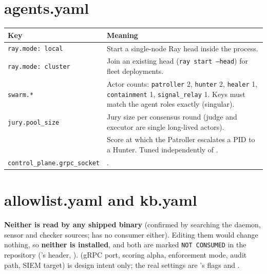 \section{agents.yaml}
\begin{center}\small
\begin{tabularx}{\textwidth}{@{}L{4.2cm}Y@{}}
\toprule
\textbf{Key} & \textbf{Meaning}\\
\midrule
\texttt{ray.mode: local} & Start a single-node Ray head inside the process.\\
\texttt{ray.mode: cluster} & Join an existing head (\texttt{ray start --head}) for fleet deployments.\\
\texttt{swarm.*} & Actor counts: \texttt{patroller} 2, \texttt{hunter} 2, \texttt{healer} 1, \texttt{containment} 1, \texttt{signal\_relay} 1. Keys must match the agent roles exactly (singular).\\
\texttt{jury.pool\_size} & Jury size per consensus round (judge and executor are single long-lived actors).\\
 & Score at which the Patroller escalates a PID to a Hunter. Tuned independently of .\\
\texttt{control\_plane.grpc\_socket} & .\\
\bottomrule
\end{tabularx}
\end{center}

\section{allowlist.yaml and kb.yaml}
\textbf{Neither is read by any shipped binary} (confirmed by searching the daemon, sensor and checker sources;  has no consumer either).
Editing them would change nothing, so \textbf{neither is installed}, and both are marked \texttt{NOT CONSUMED} in the repository
('s header, ).  (gRPC port, scoring alpha, enforcement mode, audit path, SIEM target) is
design intent only; the real settings are 's flags and .

